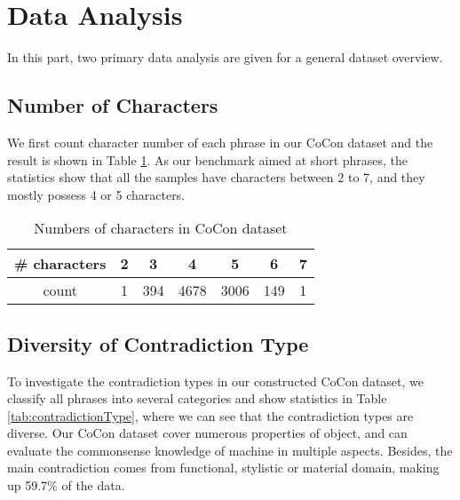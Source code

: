 \section{Data Analysis}
In this part, two primary data analysis are given for a general dataset overview. 
\subsection{Number of Characters}
We first count character number of each phrase in our CoCon dataset and the result is shown in Table \ref{tab:numCharCoCon}. %
As our benchmark aimed at %
short phrases, the statistics show that all the samples have characters between 2 to 7, and they mostly possess 4 or 5 characters. 

\begin{table}[h!]
	\small
	\centering
	\begin{tabular}{ccccccc}
		\hline
		\# characters &2&3&4&5&6&7 \\
		\hline
		count&1&394&4678&3006&149&1\\
		\hline
	\end{tabular}
	\caption{Numbers of characters in CoCon dataset}
	\label{tab:numCharCoCon}
\end{table}


\subsection{Diversity of Contradiction Type}
To investigate the contradiction types in our constructed CoCon dataset, we classify all phrases into several categories and show statistics in Table \ref{tab:contradictionType}, %
where we can see that the contradiction types are diverse. Our CoCon dataset cover numerous properties of object, and can evaluate the commonsense knowledge of machine in multiple aspects. Besides, the main contradiction comes from functional, stylistic or material domain, making up 59.7\% of the data. 

